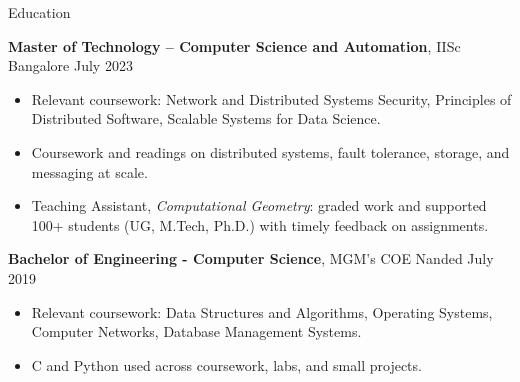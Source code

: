 \documentclass{resume} %
\begin{document}
\begin{rSection}{Education}

{\bf Master of Technology -- Computer Science and Automation}, IISc Bangalore \hfill { July 2023}
\begin{itemize}
    \item Relevant coursework: Network and Distributed Systems Security, Principles of Distributed Software, Scalable Systems for Data Science.
    \item Coursework and readings on distributed systems, fault tolerance, storage, and messaging at scale.
    \item Teaching Assistant, \textit{Computational Geometry}: graded work and supported 100+ students (UG, M.Tech, Ph.D.) with timely feedback on assignments.
\end{itemize}

{\bf Bachelor of Engineering - Computer Science}, MGM's COE Nanded \hfill {July 2019}
\begin{itemize}
    \item Relevant coursework: Data Structures and Algorithms, Operating Systems, Computer Networks, Database Management Systems.
    \item C and Python used across coursework, labs, and small projects.
\end{itemize}

\end{rSection}
\end{document}
